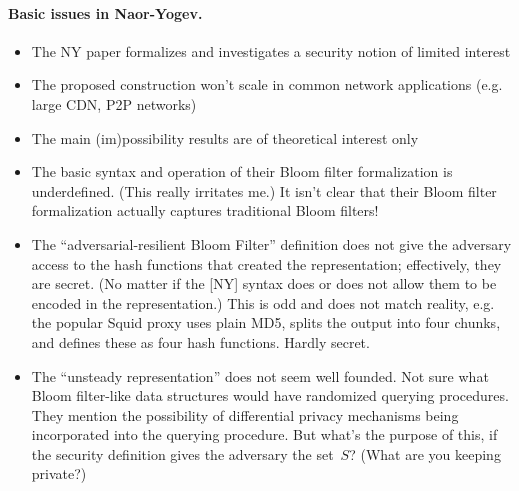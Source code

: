 \paragraph{Basic issues in Naor-Yogev. }
\begin{itemize}
\item The NY paper formalizes and investigates a security notion of limited interest
\item The proposed construction won't scale in common network applications (e.g. large CDN, P2P networks)
\item The main (im)possibility results are of theoretical interest only
\item The basic syntax and operation of their Bloom filter formalization is underdefined.  (This really irritates me.)  It isn’t clear that their Bloom filter formalization actually captures traditional Bloom filters!  
\item The ``adversarial-resilient Bloom Filter'' definition does not give the adversary access to the hash functions that created the representation; effectively, they are secret. (No matter if the [NY] syntax does or does not allow them to be encoded in the representation.)  This is odd and does not match reality, e.g. the popular Squid proxy uses plain MD5, splits the output into four chunks, and defines these as four hash functions.  Hardly secret. 
\item The ``unsteady representation'' does not seem well founded.  Not sure what Bloom filter-like data structures would have randomized querying procedures.  They mention the possibility of differential privacy mechanisms being incorporated into the querying procedure.  But what's the purpose of this, if the security definition gives the adversary the set~$S$?  (What are you keeping private?) 
\end{itemize}

